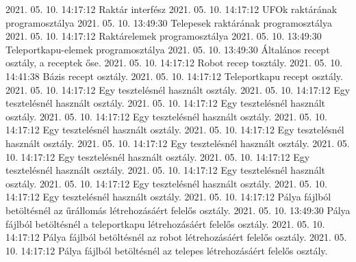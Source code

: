 {{{ {2021. 05. 10. 14:17:12} {Raktár interfész}
 {2021. 05. 10. 14:17:12} {UFOk raktárának programosztálya}
 {2021. 05. 10. 13:49:30} {Telepesek raktárának programosztálya}
 {2021. 05. 10. 14:17:12} {Raktárelemek programosztálya}
 {2021. 05. 10. 13:49:30} {Teleportkapu-elemek programosztálya}
 {2021. 05. 10. 13:49:30} {Általános recept osztály, a receptek őse.}
 {2021. 05. 10. 14:17:12} {Robot recep tosztály.}
 {2021. 05. 10. 14:41:38} {Bázis recept osztály.}
 {2021. 05. 10. 14:17:12} {Teleportkapu recept osztály.}
 {2021. 05. 10. 14:17:12} {Egy tesztelésnél használt osztály.}
 {2021. 05. 10. 14:17:12} {Egy tesztelésnél használt osztály.}
 {2021. 05. 10. 14:17:12} {Egy tesztelésnél használt osztály.}
 {2021. 05. 10. 14:17:12} {Egy tesztelésnél használt osztály.}
 {2021. 05. 10. 14:17:12} {Egy tesztelésnél használt osztály.}
 {2021. 05. 10. 14:17:12} {Egy tesztelésnél használt osztály.}
 {2021. 05. 10. 14:17:12} {Egy tesztelésnél használt osztály.}
 {2021. 05. 10. 14:17:12} {Egy tesztelésnél használt osztály.}
 {2021. 05. 10. 14:17:12} {Egy tesztelésnél használt osztály.}
 {2021. 05. 10. 14:17:12} {Egy tesztelésnél használt osztály.}
 {2021. 05. 10. 14:17:12} {Egy tesztelésnél használt osztály.}
 {2021. 05. 10. 14:17:12} {Egy tesztelésnél használt osztály.}
 {2021. 05. 10. 14:17:12} {Pálya fájlból betöltésnél az űrállomás létrehozásáért felelős osztály.}
 {2021. 05. 10. 13:49:30} {Pálya fájlból betöltésnél a teleportkapu létrehozásáért felelős osztály.}
 {2021. 05. 10. 14:17:12} {Pálya fájlból betöltésnél az robot létrehozásáért felelős osztály.}
 {2021. 05. 10. 14:17:12} {Pálya fájlból betöltésnél az telepes létrehozásáért felelős osztály.}
}}}
